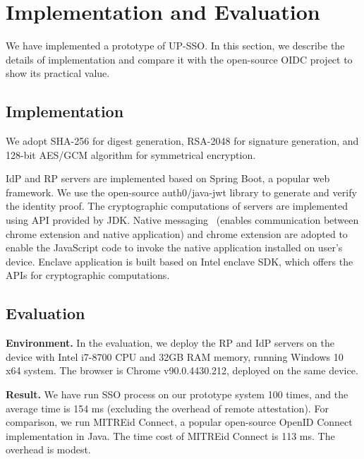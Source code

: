 \section{Implementation and Evaluation}
\label{sec:implementation}
We have implemented  a prototype of UP-SSO.
In this section, we describe the details of implementation and compare it with the open-source OIDC project to show its practical value.
\subsection{Implementation}
We adopt SHA-256 for digest generation, RSA-2048 for signature generation, and 128-bit AES/GCM algorithm for symmetrical encryption. 


IdP and RP servers are implemented based on Spring Boot, a popular web framework. 
We use the open-source auth0/java-jwt library to generate and verify the identity proof. 
The cryptographic computations of servers are implemented using API provided by JDK. 
Native messaging~\cite{NativeMessaging} (enables communication between chrome extension and native application) and chrome extension are  adopted to enable the JavaScript code to invoke the native application installed on user's device. 
Enclave application is built based on Intel enclave SDK,
which offers the APIs for cryptographic computations.%

\subsection{Evaluation}
\noindent\textbf{Environment.}
In the evaluation, we deploy the RP and IdP servers on the device with Intel i7-8700 CPU and 32GB RAM memory, running Windows 10 x64 system. The browser is Chrome v90.0.4430.212, deployed on the same device.   



\vspace{1mm}\noindent\textbf{Result.}
We have run SSO process on our prototype system 100 times, and the average time is 154 ms (excluding the overhead of remote attestation). For comparison, we run MITREid Connect, a popular open-source OpenID Connect implementation in Java. The time cost of  MITREid Connect is 113 ms. The overhead is modest.